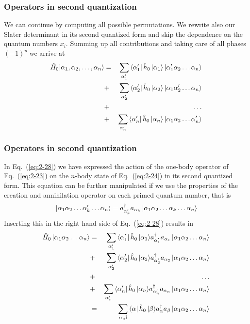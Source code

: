 \frame
{
  \frametitle{Operators in second quantization}
\begin{small}
{\scriptsize
We can continue by computing all possible permutations. 
We rewrite also our Slater determinant in its second quantized form and skip the dependence on the quantum numbers $x_i.$
Summing up all contributions and taking care of all phases
$(-1)^p$ we arrive at 
\begin{eqnarray}
	\hat{H}_0|\alpha_1,\alpha_2,\dots, \alpha_n\rangle &=& \sum_{\alpha_1'}\element{\alpha_1'}{\hat{h}_0}{\alpha_1}
		\ket{\alpha_1'\alpha_2 \dots \alpha_{n}} \nonumber \\
	&+& \sum_{\alpha_2'} \element{\alpha_2'}{\hat{h}_0}{\alpha_2}
		\ket{\alpha_1\alpha_2' \dots \alpha_{n}} \nonumber \\
	&+& \dots \nonumber \\
	&+& \sum_{\alpha_n'} \element{\alpha_n'}{\hat{h}_0}{\alpha_n}
		\ket{\alpha_1\alpha_2 \dots \alpha_{n}'} \label{eq:2-28}
\end{eqnarray}
}
\end{small}
}


\frame
{
  \frametitle{Operators in second quantization}
\begin{small}
{\scriptsize
In Eq.~(\ref{eq:2-28}) 
we have expressed the action of the one-body operator
of Eq.~(\ref{eq:2-23}) on the  $n$-body state of Eq.~(\ref{eq:2-24}) in its second quantized form.
This equation can be further manipulated if we use the properties of the creation and annihilation operator
on each primed quantum number, that is
\begin{equation}
	\ket{\alpha_1\alpha_2 \dots \alpha_k' \dots \alpha_{n}} = 
		a_{\alpha_k'}^\dagger  a_{\alpha_k} \ket{\alpha_1\alpha_2 \dots \alpha_k \dots \alpha_{n}} \label{eq:2-29}
\end{equation}
Inserting this in the right-hand side of Eq.~(\ref{eq:2-28}) results in
\begin{eqnarray}
	\hat{H}_0\ket{\alpha_1\alpha_2 \dots \alpha_{n}} &=& \sum_{\alpha_1'}\element{\alpha_1'}{\hat{h}_0}{\alpha_1}
		a_{\alpha_1'}^\dagger  a_{\alpha_1} \ket{\alpha_1\alpha_2 \dots \alpha_{n}} \nonumber \\
	&+& \sum_{\alpha_2'} \element{\alpha_2'}{\hat{h}_0}{\alpha_2}
		a_{\alpha_2'}^\dagger  a_{\alpha_2} \ket{\alpha_1\alpha_2 \dots \alpha_{n}} \nonumber \\
	&+& \dots \nonumber \\
	&+& \sum_{\alpha_n'} \element{\alpha_n'}{\hat{h}_0}{\alpha_n}
		a_{\alpha_n'}^\dagger  a_{\alpha_n} \ket{\alpha_1\alpha_2 \dots \alpha_{n}} \nonumber \\
	&=& \sum_{\alpha, \beta} \element{\alpha}{\hat{h}_0}{\beta} a_\alpha^\dagger a_\beta 
		\ket{\alpha_1\alpha_2 \dots \alpha_{n}} \label{eq:2-30a}
\end{eqnarray}
}
\end{small}
}


